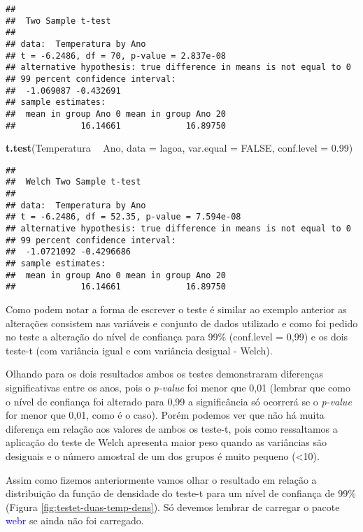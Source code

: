 \documentclass[titlepage, oneside, openany, a4paper]{book}
\newenvironment{Shaded}{\begin{snugshade}}{\end{snugshade}}
\newcommand{\DataTypeTok}[1]{\textcolor[rgb]{0.13,0.29,0.53}{#1}}
\newcommand{\FloatTok}[1]{\textcolor[rgb]{0.00,0.00,0.81}{#1}}
\newcommand{\KeywordTok}[1]{\textcolor[rgb]{0.13,0.29,0.53}{\textbf{#1}}}
\newcommand{\NormalTok}[1]{#1}
\newcommand{\OperatorTok}[1]{\textcolor[rgb]{0.81,0.36,0.00}{\textbf{#1}}}
\newcommand{\OtherTok}[1]{\textcolor[rgb]{0.56,0.35,0.01}{#1}}
\newcommand{\StringTok}[1]{\textcolor[rgb]{0.31,0.60,0.02}{#1}}
\begin{document}
\begin{verbatim}
## 
##  Two Sample t-test
## 
## data:  Temperatura by Ano
## t = -6.2486, df = 70, p-value = 2.837e-08
## alternative hypothesis: true difference in means is not equal to 0
## 99 percent confidence interval:
##  -1.069087 -0.432691
## sample estimates:
##  mean in group Ano 0 mean in group Ano 20 
##             16.14661             16.89750
\end{verbatim}

\begin{Shaded}
\begin{Highlighting}[]
\KeywordTok{t.test}\NormalTok{(Temperatura }\OperatorTok{~}\StringTok{ }\NormalTok{Ano, }
       \DataTypeTok{data =}\NormalTok{ lagoa,}
       \DataTypeTok{var.equal =} \OtherTok{FALSE}\NormalTok{,}
       \DataTypeTok{conf.level =} \FloatTok{0.99}\NormalTok{)}
\end{Highlighting}
\end{Shaded}

\begin{verbatim}
## 
##  Welch Two Sample t-test
## 
## data:  Temperatura by Ano
## t = -6.2486, df = 52.35, p-value = 7.594e-08
## alternative hypothesis: true difference in means is not equal to 0
## 99 percent confidence interval:
##  -1.0721092 -0.4296686
## sample estimates:
##  mean in group Ano 0 mean in group Ano 20 
##             16.14661             16.89750
\end{verbatim}

Como podem notar a forma de escrever o teste é similar ao exemplo anterior as alterações consistem nas variáveis e conjunto de dados utilizado e como foi pedido no teste a alteração do nível de confiança para 99\% (conf.level = 0,99) e os dois teste-t (com variância igual e com variância desigual - Welch).

Olhando para os dois resultados ambos os testes demonstraram diferenças significativas entre os anos, pois o \emph{p-value} foi menor que 0,01 (lembrar que como o nível de confiança foi alterado para 0,99 a significância só ocorrerá se o \emph{p-value} for menor que 0,01, como é o caso). Porém podemos ver que não há muita diferença em relação aos valores de ambos os teste-t, pois como ressaltamos a aplicação do teste de Welch apresenta maior peso quando as variâncias são desiguais e o número amostral de um dos grupos é muito pequeno (\textless{}10).

Assim como fizemos anteriormente vamos olhar o resultado em relação a distribuição da função de densidade do teste-t para um nível de confiança de 99\% (Figura \ref{fig:testet-duas-temp-dens}). Só devemos lembrar de carregar o pacote \textcolor{blue}{webr} se ainda não foi carregado.
\end{document}
